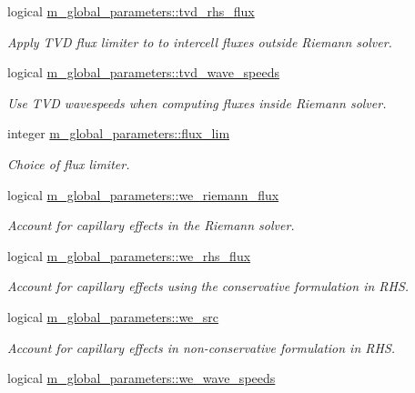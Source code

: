 \begin{DoxyCompactItemize}
logical \hyperlink{namespacem__global__parameters_a19e98f005eebfd43e924ed2339a1a430}{m\+\_\+global\+\_\+parameters\+::tvd\+\_\+rhs\+\_\+flux}
\begin{DoxyCompactList}\small\item\em Apply T\+VD flux limiter to to intercell fluxes outside Riemann solver. \end{DoxyCompactList}\item 
logical \hyperlink{namespacem__global__parameters_a4ed04ef4019b9be697d7f13b3d207a17}{m\+\_\+global\+\_\+parameters\+::tvd\+\_\+wave\+\_\+speeds}
\begin{DoxyCompactList}\small\item\em Use T\+VD wavespeeds when computing fluxes inside Riemann solver. \end{DoxyCompactList}\item 
integer \hyperlink{namespacem__global__parameters_acbb163a79ff0011a4327c3fb65a04c14}{m\+\_\+global\+\_\+parameters\+::flux\+\_\+lim}
\begin{DoxyCompactList}\small\item\em Choice of flux limiter. \end{DoxyCompactList}\item 
logical \hyperlink{namespacem__global__parameters_a99557d578d538a853b5fd9e445ad6303}{m\+\_\+global\+\_\+parameters\+::we\+\_\+riemann\+\_\+flux}
\begin{DoxyCompactList}\small\item\em Account for capillary effects in the Riemann solver. \end{DoxyCompactList}\item 
logical \hyperlink{namespacem__global__parameters_acfd358e345eac06daf89ca40651ba2c8}{m\+\_\+global\+\_\+parameters\+::we\+\_\+rhs\+\_\+flux}
\begin{DoxyCompactList}\small\item\em Account for capillary effects using the conservative formulation in R\+HS. \end{DoxyCompactList}\item 
logical \hyperlink{namespacem__global__parameters_a897b4f61353235b3af13bac633d5b9a0}{m\+\_\+global\+\_\+parameters\+::we\+\_\+src}
\begin{DoxyCompactList}\small\item\em Account for capillary effects in non-\/conservative formulation in R\+HS. \end{DoxyCompactList}\item 
logical \hyperlink{namespacem__global__parameters_afe755241e6fe1e3a132aec6feab74ae4}{m\+\_\+global\+\_\+parameters\+::we\+\_\+wave\+\_\+speeds}

\end{DoxyCompactItemize}
